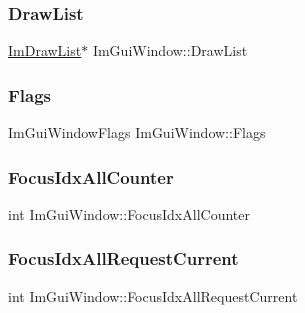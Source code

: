 \hypertarget{struct_im_gui_window_a39de4668b09754136c6fd7ab89ab674a}{}\label{struct_im_gui_window_a39de4668b09754136c6fd7ab89ab674a} 
\subsubsection{\texorpdfstring{Draw\+List}{DrawList}}
{\footnotesize\ttfamily \hyperlink{struct_im_draw_list}{Im\+Draw\+List}$\ast$ Im\+Gui\+Window\+::\+Draw\+List}

\hypertarget{struct_im_gui_window_a7c29e810a533b9a647cce5d93d45057f}{}\label{struct_im_gui_window_a7c29e810a533b9a647cce5d93d45057f} 
\subsubsection{\texorpdfstring{Flags}{Flags}}
{\footnotesize\ttfamily Im\+Gui\+Window\+Flags Im\+Gui\+Window\+::\+Flags}

\hypertarget{struct_im_gui_window_a51ee526aed5b993e0a849f2db1fdc4dc}{}\label{struct_im_gui_window_a51ee526aed5b993e0a849f2db1fdc4dc} 
\subsubsection{\texorpdfstring{Focus\+Idx\+All\+Counter}{FocusIdxAllCounter}}
{\footnotesize\ttfamily int Im\+Gui\+Window\+::\+Focus\+Idx\+All\+Counter}

\hypertarget{struct_im_gui_window_adfbeeeaa2eebd054ec0cd99dccb34f2f}{}\label{struct_im_gui_window_adfbeeeaa2eebd054ec0cd99dccb34f2f} 
\subsubsection{\texorpdfstring{Focus\+Idx\+All\+Request\+Current}{FocusIdxAllRequestCurrent}}
{\footnotesize\ttfamily int Im\+Gui\+Window\+::\+Focus\+Idx\+All\+Request\+Current}

